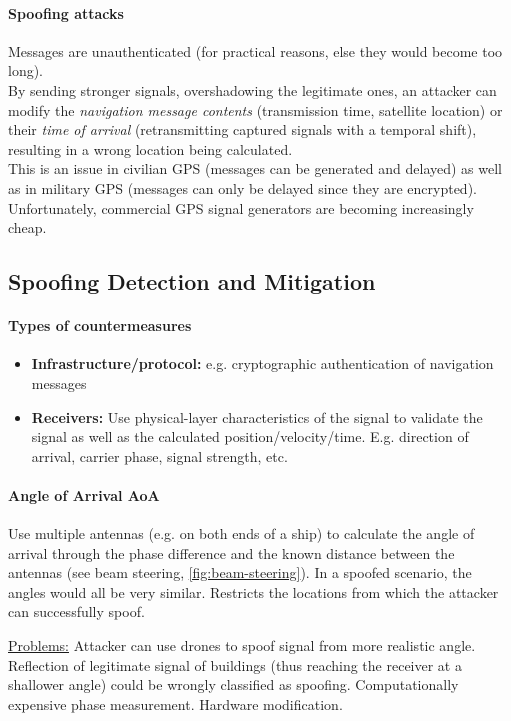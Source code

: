\paragraph{Spoofing attacks}
Messages are unauthenticated (for practical reasons, else they would become too long).
\\
By sending stronger signals, overshadowing the legitimate ones, an attacker can modify the \textit{navigation message contents} (transmission time, satellite location) or their \textit{time of arrival} (retransmitting captured signals with a temporal shift), resulting in a wrong location being calculated.
\\
This is an issue in civilian GPS (messages can be generated and delayed) as well as in military GPS (messages can only be delayed since they are encrypted).
Unfortunately, commercial GPS signal generators are becoming increasingly cheap.


\subsection{Spoofing Detection and Mitigation}

\paragraph{Types of countermeasures}
\begin{itemize}
	\item \textbf{Infrastructure/protocol:} e.g. cryptographic authentication of navigation messages
	\item \textbf{Receivers:}
	Use physical-layer characteristics of the signal to validate the signal as well as the calculated position/velocity/time.
	E.g. direction of arrival, carrier phase, signal strength, etc.
\end{itemize}

\paragraph{Angle of Arrival AoA}
Use multiple antennas (e.g. on both ends of a ship) to calculate the angle of arrival through the phase difference and the known distance between the antennas (see beam steering, \autoref{fig:beam-steering}).
In a spoofed scenario, the angles would all be very similar.
Restricts the locations from which the attacker can successfully spoof.

\underline{Problems:}
Attacker can use drones to spoof signal from more realistic angle.
Reflection of legitimate signal of buildings (thus reaching the receiver at a shallower angle) could be wrongly classified as spoofing.
Computationally expensive phase measurement.
Hardware modification.

